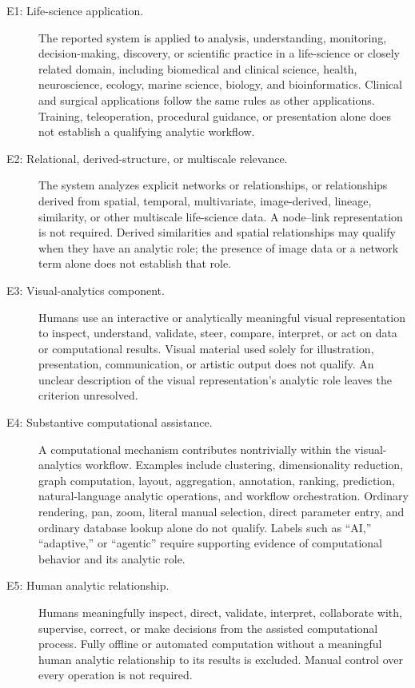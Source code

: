 \begin{description}
\item[E1: Life-science application.] The reported system is applied to analysis, understanding, monitoring, decision-making, discovery, or scientific practice in a life-science or closely related domain, including biomedical and clinical science, health, neuroscience, ecology, marine science, biology, and bioinformatics. Clinical and surgical applications follow the same rules as other applications. Training, teleoperation, procedural guidance, or presentation alone does not establish a qualifying analytic workflow.

\item[E2: Relational, derived-structure, or multiscale relevance.] The system analyzes explicit networks or relationships, or relationships derived from spatial, temporal, multivariate, image-derived, lineage, similarity, or other multiscale life-science data. A node--link representation is not required. Derived similarities and spatial relationships may qualify when they have an analytic role; the presence of image data or a network term alone does not establish that role.

\item[E3: Visual-analytics component.] Humans use an interactive or analytically meaningful visual representation to inspect, understand, validate, steer, compare, interpret, or act on data or computational results. Visual material used solely for illustration, presentation, communication, or artistic output does not qualify. An unclear description of the visual representation's analytic role leaves the criterion unresolved.

\item[E4: Substantive computational assistance.] A computational mechanism contributes nontrivially within the visual-analytics workflow. Examples include clustering, dimensionality reduction, graph computation, layout, aggregation, annotation, ranking, prediction, natural-language analytic operations, and workflow orchestration. Ordinary rendering, pan, zoom, literal manual selection, direct parameter entry, and ordinary database lookup alone do not qualify. Labels such as ``AI,'' ``adaptive,'' or ``agentic'' require supporting evidence of computational behavior and its analytic role.

\item[E5: Human analytic relationship.] Humans meaningfully inspect, direct, validate, interpret, collaborate with, supervise, correct, or make decisions from the assisted computational process. Fully offline or automated computation without a meaningful human analytic relationship to its results is excluded. Manual control over every operation is not required.
\end{description}

